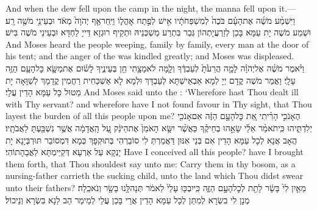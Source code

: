 {And when the dew fell upon the camp in the night, the manna fell upon it.—}{}
{וַיִּשְׁמַ֨ע מֹשֶׁ֜ה אֶת\maqqaf הָעָ֗ם בֹּכֶה֙ לְמִשְׁפְּחֹתָ֔יו אִ֖ישׁ לְפֶ֣תַח אׇהֳל֑וֹ וַיִּֽחַר\maqqaf אַ֤ף יְהֹוָה֙ מְאֹ֔ד וּבְעֵינֵ֥י מֹשֶׁ֖ה רָֽע׃}
{וּשְׁמַע מֹשֶׁה יָת עַמָּא בָּכַן לְזַרְעֲיָתְהוֹן גְּבַר בִּתְרַע מַשְׁכְּנֵיהּ וּתְקֵיף רוּגְזָא דַּייָ לַחְדָּא וּבְעֵינֵי מֹשֶׁה בִּישׁ׃}
{And Moses heard the people weeping, family by family, every man at the door of his tent; and the anger of the \lord\space was kindled greatly; and Moses was displeased.}{}
{וַיֹּ֨אמֶר מֹשֶׁ֜ה אֶל\maqqaf יְהֹוָ֗ה לָמָ֤ה הֲרֵעֹ֙תָ֙ לְעַבְדֶּ֔ךָ וְלָ֛מָּה לֹא\maqqaf מָצָ֥תִי חֵ֖ן בְּעֵינֶ֑יךָ לָשׂ֗וּם אֶת\maqqaf מַשָּׂ֛א כׇּל\maqqaf הָעָ֥ם הַזֶּ֖ה עָלָֽי׃}
{וַאֲמַר מֹשֶׁה קֳדָם יְיָ לְמָא אַבְאֵישְׁתָּא לְעַבְדָּךְ וּלְמָא לָא אַשְׁכַּחִית רַחֲמִין קֳדָמָךְ לְשַׁוָּאָה יָת מַטוּל כָּל עַמָּא הָדֵין עֲלָי׃}
{And Moses said unto the \lord: ‘Wherefore hast Thou dealt ill with Thy servant? and wherefore have I not found favour in Thy sight, that Thou layest the burden of all this people upon me?}{}
{הֶאָנֹכִ֣י הָרִ֗יתִי אֵ֚ת כׇּל\maqqaf הָעָ֣ם הַזֶּ֔ה אִם\maqqaf אָנֹכִ֖י יְלִדְתִּ֑יהוּ כִּֽי\maqqaf תֹאמַ֨ר אֵלַ֜י שָׂאֵ֣הוּ בְחֵיקֶ֗ךָ כַּאֲשֶׁ֨ר יִשָּׂ֤א הָאֹמֵן֙ אֶת\maqqaf הַיֹּנֵ֔ק עַ֚ל הָֽאֲדָמָ֔ה אֲשֶׁ֥ר נִשְׁבַּ֖עְתָּ לַאֲבֹתָֽיו׃}
{הֲאָב אֲנָא לְכָל עַמָּא הָדֵין אִם בְּנַי אִנּוּן דַּאֲמַרְתְּ לִי סוֹבַרְהִי בְּתוּקְפָךְ כְּמָא דִּמְסוֹבַר תּוּרְבְּיָנָא יָת יָנְקָא עַל אַרְעָא דְּקַיֵּימְתָּא לַאֲבָהָתוֹהִי׃}
{Have I conceived all this people? have I brought them forth, that Thou shouldest say unto me: Carry them in thy bosom, as a nursing-father carrieth the sucking child, unto the land which Thou didst swear unto their fathers?}{}
{מֵאַ֤יִן לִי֙ בָּשָׂ֔ר לָתֵ֖ת לְכׇל\maqqaf הָעָ֣ם הַזֶּ֑ה כִּֽי\maqqaf יִבְכּ֤וּ עָלַי֙ לֵאמֹ֔ר תְּנָה\maqqaf לָּ֥נוּ בָשָׂ֖ר וְנֹאכֵֽלָה׃}
{מְנָן לִי בִשְׂרָא לְמִתַּן לְכָל עַמָּא הָדֵין אֲרֵי בָּכַן עֲלַי לְמֵימַר הַב לַנָא בִשְׂרָא וְנֵיכוֹל׃}
